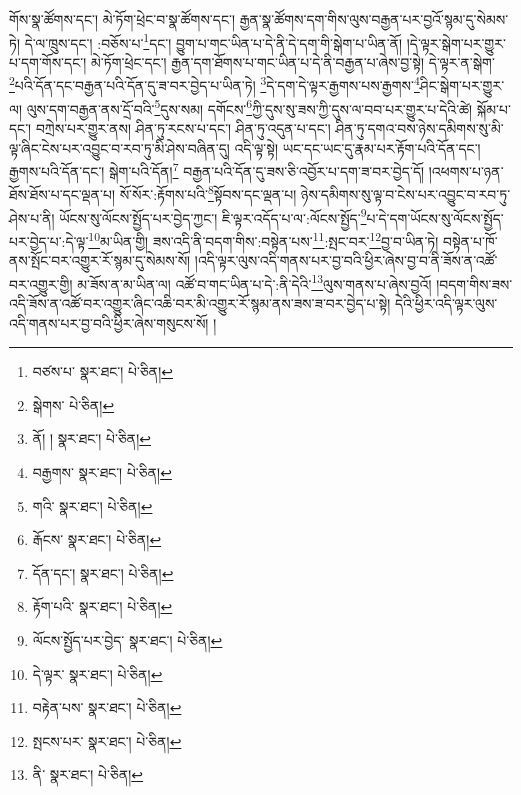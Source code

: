 གོས་སྣ་ཚོགས་དང་། མེ་ཏོག་ཕྲེང་བ་སྣ་ཚོགས་དང་། རྒྱན་སྣ་ཚོགས་དག་གིས་ལུས་བརྒྱན་པར་བྱའོ་སྙམ་དུ་སེམས་ཏེ། དེ་ལ་ཁྲུས་དང་། :བཅོས་པ་\footnote{བཙས་པ་  སྣར་ཐང་།  པེ་ཅིན། }དང་། བྱུག་པ་གང་ཡིན་པ་དེ་ནི་དེ་དག་གི་སྒེག་པ་ཡིན་ནོ། །དེ་ལྟར་སྒེག་པར་གྱུར་པ་དག་གོས་དང་། མེ་ཏོག་ཕྲེང་དང་། རྒྱན་དག་ཐོགས་པ་གང་ཡིན་པ་དེ་ནི་བརྒྱན་པ་ཞེས་བྱ་སྟེ། དེ་ལྟར་ན་སྒེག་\footnote{སྒེགས་  པེ་ཅིན། }པའི་དོན་དང་བརྒྱན་པའི་དོན་དུ་ཟ་བར་བྱེད་པ་ཡིན་ཏེ། \footnote{ནོ། །   སྣར་ཐང་།  པེ་ཅིན། }དེ་དག་དེ་ལྟར་རྒྱགས་པས་རྒྱགས་\footnote{བརྒྱགས་  སྣར་ཐང་།  པེ་ཅིན། }ཤིང་སྒེག་པར་གྱུར་ལ། ལུས་དག་བརྒྱན་ནས་དྲོ་བའི་\footnote{གའི་  སྣར་ཐང་།  པེ་ཅིན། }དུས་སམ། དགོངས་\footnote{རྒོངས་  སྣར་ཐང་།  པེ་ཅིན། }ཀྱི་དུས་སུ་ཟས་ཀྱི་དུས་ལ་བབ་པར་གྱུར་པ་དེའི་ཚེ། སྐོམ་པ་དང་། བཀྲེས་པར་གྱུར་ནས། ཤིན་ཏུ་རངས་པ་དང་། ཤིན་ཏུ་འདུན་པ་དང་། ཤིན་ཏུ་དགའ་བས་ཉེས་དམིགས་སུ་མི་ལྟ་ཞིང་ངེས་པར་འབྱུང་བ་རབ་ཏུ་མི་ཤེས་བཞིན་དུ། འདི་ལྟ་སྟེ། ཡང་དང་ཡང་དུ་རྣམ་པར་རྟོག་པའི་དོན་དང་། རྒྱགས་པའི་དོན་དང་། སྒེག་པའི་དོན།\footnote{དོན་དང་།  སྣར་ཐང་།  པེ་ཅིན། } བརྒྱན་པའི་དོན་དུ་ཟས་ཅི་འབྱོར་པ་དག་ཟ་བར་བྱེད་དོ། །འཕགས་པ་ཉན་ཐོས་ཐོས་པ་དང་ལྡན་པ། སོ་སོར་:རྟོགས་པའི་\footnote{རྟོག་པའི་  སྣར་ཐང་།  པེ་ཅིན། }སྟོབས་དང་ལྡན་པ། ཉེས་དམིགས་སུ་ལྟ་བ་ངེས་པར་འབྱུང་བ་རབ་ཏུ་ཤེས་པ་ནི། ཡོངས་སུ་ལོངས་སྤྱོད་པར་བྱེད་ཀྱང་། ཇི་ལྟར་འདོད་པ་ལ་:ལོངས་སྤྱོད་\footnote{ལོངས་སྤྱོད་པར་བྱེད་  སྣར་ཐང་།  པེ་ཅིན། }པ་དེ་དག་ཡོངས་སུ་ལོངས་སྤྱོད་པར་བྱེད་པ་:དེ་ལྟ་\footnote{དེ་ལྟར་  སྣར་ཐང་།  པེ་ཅིན། }མ་ཡིན་གྱི། ཟས་འདི་ནི་བདག་གིས་:བསྟེན་པས་\footnote{བརྟེན་པས་  སྣར་ཐང་།  པེ་ཅིན། }:སྤང་བར་\footnote{སྤངས་པར་  སྣར་ཐང་།  པེ་ཅིན། }བྱ་བ་ཡིན་ཏེ། བསྟེན་པ་ཁོ་ནས་སྤོང་བར་འགྱུར་རོ་སྙམ་དུ་སེམས་སོ། །འདི་ལྟར་ལུས་འདི་གནས་པར་བྱ་བའི་ཕྱིར་ཞེས་བྱ་བ་ནི་ཟོས་ན་འཚོ་བར་འགྱུར་གྱི། མ་ཟོས་ན་མ་ཡིན་ལ། འཚོ་བ་གང་ཡིན་པ་དེ་:ནི་དེའི་\footnote{ནི་  སྣར་ཐང་།  པེ་ཅིན། }ལུས་གནས་པ་ཞེས་བྱའོ། །བདག་གིས་ཟས་འདི་ཟོས་ན་འཚོ་བར་འགྱུར་ཞིང་འཆི་བར་མི་འགྱུར་རོ་སྙམ་ནས་ཟས་ཟ་བར་བྱེད་པ་སྟེ། དེའི་ཕྱིར་འདི་ལྟར་ལུས་འདི་གནས་པར་བྱ་བའི་ཕྱིར་ཞེས་གསུངས་སོ། །
